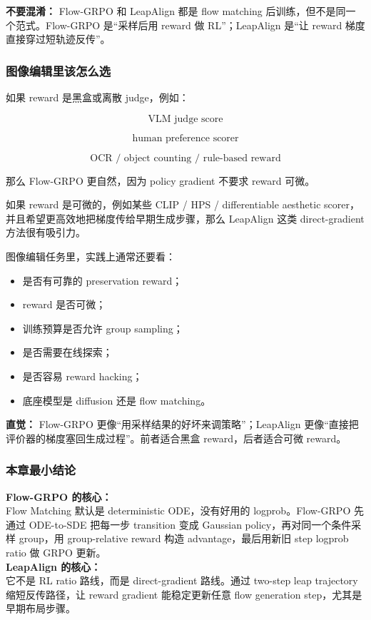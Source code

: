 \begin{warnbox}
\textbf{不要混淆：} Flow-GRPO 和 LeapAlign 都是 flow matching 后训练，但不是同一个范式。Flow-GRPO 是“采样后用 reward 做 RL”；LeapAlign 是“让 reward 梯度直接穿过短轨迹反传”。
\end{warnbox}

\subsubsection{图像编辑里该怎么选}

如果 reward 是黑盒或离散 judge，例如：

\[
\text{VLM judge score}
\]

\[
\text{human preference scorer}
\]

\[
\text{OCR / object counting / rule-based reward}
\]

那么 Flow-GRPO 更自然，因为 policy gradient 不要求 reward 可微。

如果 reward 是可微的，例如某些 CLIP / HPS / differentiable aesthetic scorer，并且希望更高效地把梯度传给早期生成步骤，那么 LeapAlign 这类 direct-gradient 方法很有吸引力。

图像编辑任务里，实践上通常还要看：

\begin{itemize}[leftmargin=1.5em]
  \item 是否有可靠的 preservation reward；
  \item reward 是否可微；
  \item 训练预算是否允许 group sampling；
  \item 是否需要在线探索；
  \item 是否容易 reward hacking；
  \item 底座模型是 diffusion 还是 flow matching。
\end{itemize}

\begin{intubox}
\textbf{直觉：} Flow-GRPO 更像“用采样结果的好坏来调策略”；LeapAlign 更像“直接把评价器的梯度塞回生成过程”。前者适合黑盒 reward，后者适合可微 reward。
\end{intubox}

\subsubsection{本章最小结论}

\begin{summarybox}
\textbf{Flow-GRPO 的核心：}\\
Flow Matching 默认是 deterministic ODE，没有好用的 logprob。Flow-GRPO 先通过 ODE-to-SDE 把每一步 transition 变成 Gaussian policy，再对同一个条件采样 group，用 group-relative reward 构造 advantage，最后用新旧 step logprob ratio 做 GRPO 更新。\\
\textbf{LeapAlign 的核心：}\\
它不是 RL ratio 路线，而是 direct-gradient 路线。通过 two-step leap trajectory 缩短反传路径，让 reward gradient 能稳定更新任意 flow generation step，尤其是早期布局步骤。
\end{summarybox}

